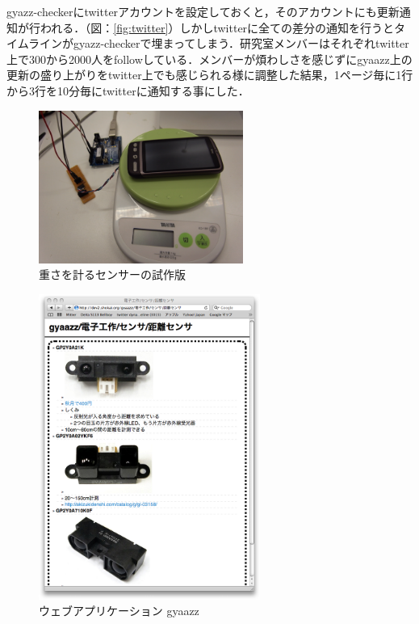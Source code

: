 gyazz-checkerにtwitterアカウントを設定しておくと，そのアカウントにも更新通知が行われる．（図：\ref{fig:twitter}）しかしtwitterに全ての差分の通知を行うとタイムラインがgyazz-checkerで埋まってしまう．研究室メンバーはそれぞれtwitter上で300から2000人をfollowしている．メンバーが煩わしさを感じずにgyaazz上の更新の盛り上がりをtwitter上でも感じられる様に調整した結果，1ページ毎に1行から3行を10分毎にtwitterに通知する事にした．

\begin{figure}
  \begin{center}
    \includegraphics[height=50mm]{img/sensor.png}
  \end{center}
  \caption{重さを計るセンサーの試作版}
  \label{fig:sensor}
\end{figure}

\begin{figure}
  \begin{center}
    \includegraphics[height=100mm]{img/gyaazz.png}
  \end{center}
  \caption{ウェブアプリケーション gyaazz}
  \label{fig:gyaazz}
\end{figure}

